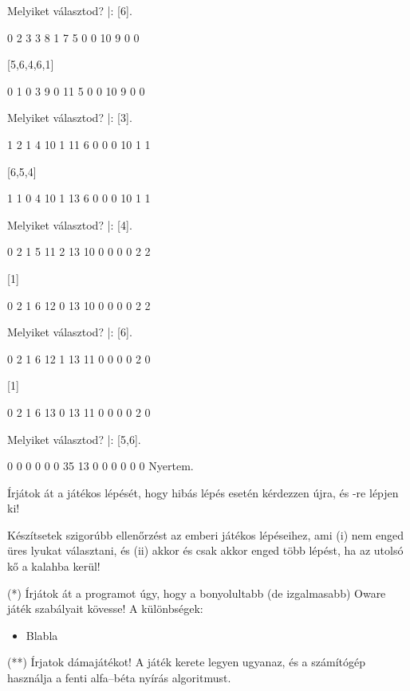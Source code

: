 \begin{query}
Melyiket választod?
|: [6].

     0    2    3    3    8    1
7                                  5
     0    0    10   9    0    0

[5,6,4,6,1]

     0    1    0    3    9    0
11                                 5
     0    0    10   9    0    0

Melyiket választod?
|: [3].

     1    2    1    4    10   1
11                                 6
     0    0    0    10   1    1

[6,5,4]

     1    1    0    4    10   1
13                                 6
     0    0    0    10   1    1

Melyiket választod?
|: [4].

     0    2    1    5    11   2
13                                 10
     0    0    0    0    2    2

[1]

     0    2    1    6    12   0
13                                 10
     0    0    0    0    2    2

Melyiket választod?
|: [6].

     0    2    1    6    12   1
13                                 11
     0    0    0    0    2    0

[1]

     0    2    1    6    13   0
13                                 11
     0    0    0    0    2    0

Melyiket választod?
|: [5,6].

     0    0    0    0    0    0
35                                 13
     0    0    0    0    0    0
Nyertem.
\end{query}

\begin{problem}
Írjátok át a játékos lépését, hogy hibás lépés
esetén kérdezzen újra, és -re lépjen ki!
\end{problem}
\begin{problem}
Készítsetek szigorúbb ellenőrzést az emberi játékos
lépéseihez, ami (i) nem enged üres lyukat
választani, és (ii) akkor és csak akkor enged több
lépést, ha az utolsó kő a kalahba kerül!
\end{problem}
\begin{problem} (*)
Írjátok át a programot úgy, hogy a bonyolultabb (de
izgalmasabb) Oware játék szabályait kövesse!  A
különbségek:
\begin{itemize}
\item Blabla  
\end{itemize}
\end{problem}
\begin{problem} (**)
Írjatok dámajátékot! A játék kerete legyen ugyanaz,
és a számítógép használja a fenti alfa--béta nyírás
algoritmust.
\end{problem}

